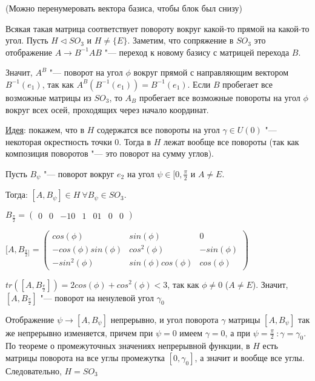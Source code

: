 \documentclass{article}
\begin{document}
(Можно перенумеровать вектора базиса, чтобы блок был снизу)

Всякая такая матрица соответствует повороту вокруг какой-то прямой на какой-то угол. Пусть $H \triangleleft SO_3$ и $H \neq \{E\}$. Заметим, что сопряжение в $SO_3$ это отображение $A \rightarrow B^{-1}AB$ "--- переход к новому базису с матрицей перехода $B$.

Значит, $A^B$ "--- поворот на угол $\phi$ вокруг прямой с направляющим вектором $B^{-1}(e_1)$, так как $A^B(B^{-1}(e_1)) = B^{-1}(e_1)$. Если $B$ пробегает все возможные матрицы из $SO_3$, то $A_B$ пробегает все возможные повороты на угол $\phi$ вокруг всех осей, проходящих через начало координат.

\underline{Идея}: покажем, что в $H$ содержатся все повороты на угол $\gamma \in U(0)$ "--- некоторая окрестность точки 0. Тогда в $H$ лежат вообще все повороты (так как композиция поворотов "--- это поворот на сумму углов).

Пусть $B_{\psi}$ "--- поворот вокруг $e_2$ на угол $\psi \in [0, \frac{\pi}{2}$ и $A \neq E$. 

Тогда: $[A, B_{\psi}] \in H \  \forall B_{\psi} \in SO_3$.

$B_{\frac{\pi}{2}} = \begin{pmatrix}
0 & 0 & -1
0 & 1 & 0
1 & 0 & 0
\end{pmatrix}$

$[A, B_{\frac{\pi}{2}]} = \begin{pmatrix}
cos(\phi) & sin(\phi) & 0 \\
-cos(\phi)sin(\phi) & cos^2(\phi) & -sin(\phi) \\
-sin^2(\phi) & sin(\phi)cos(\phi) & cos(\phi)
\end{pmatrix}$

$tr([A, B_{\frac{\pi}{2}}]) = 2cos(\phi) + cos^2(\phi) < 3$, так как $\phi \neq 0$ ($A \neq E$). Значит, $[A, B_{\frac{\pi}{2}}]$ "--- поворот на ненулевой угол $\gamma_0$

Отображение $\psi \rightarrow [A, B_{\psi}]$ непрерывно, и угол поворота $\gamma$ матрицы $[A, B_{\psi}]$ так же непрерывно изменяется, причем при $\psi = 0$ имеем $\gamma = 0$, а при $\psi = \frac{\pi}{2} \ :  \gamma = \gamma_0$. По теореме о промежуточных значениях непрерывной функции, в $H$ есть матрицы поворота на все углы промежутка $[0, \gamma_0]$, а значит и вообще все углы. Следовательно, $H = SO_3$
\end{document}
